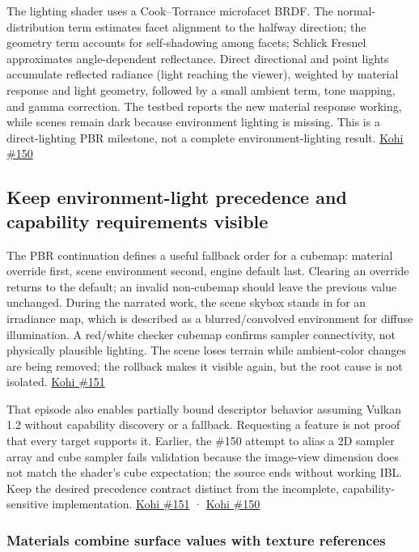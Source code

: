 The lighting shader uses a Cook--Torrance microfacet BRDF. The normal-distribution term estimates facet alignment to the halfway direction; the geometry term accounts for self-shadowing among facets; Schlick Fresnel approximates angle-dependent reflectance. Direct directional and point lights accumulate reflected radiance (light reaching the viewer), weighted by material response and light geometry, followed by a small ambient term, tone mapping, and gamma correction. The testbed reports the new material response working, while scenes remain dark because environment lighting is missing. This is a direct-lighting PBR milestone, not a complete environment-lighting result. \href{https://www.youtube.com/watch?v=SNdjjeRAFc4}{Kohi \#150}

\subsection{Keep environment-light precedence and capability requirements visible}\label{06-engine-ii-ch025-keep-environment-light-precedence-and-capability-requirements-visible}

The PBR continuation defines a useful fallback order for a cubemap: material override first, scene environment second, engine default last. Clearing an override returns to the default; an invalid non-cubemap should leave the previous value unchanged. During the narrated work, the scene skybox stands in for an irradiance map, which is described as a blurred/convolved environment for diffuse illumination. A red/white checker cubemap confirms sampler connectivity, not physically plausible lighting. The scene loses terrain while ambient-color changes are being removed; the rollback makes it visible again, but the root cause is not isolated. \href{https://www.youtube.com/watch?v=OME4d4Zwd7k}{Kohi \#151}

That episode also enables partially bound descriptor behavior assuming Vulkan 1.2 without capability discovery or a fallback. Requesting a feature is not proof that every target supports it. Earlier, the \#150 attempt to alias a 2D sampler array and cube sampler fails validation because the image-view dimension does not match the shader's cube expectation; the source ends without working IBL. Keep the desired precedence contract distinct from the incomplete, capability-sensitive implementation. \href{https://www.youtube.com/watch?v=OME4d4Zwd7k}{Kohi \#151} · \href{https://www.youtube.com/watch?v=SNdjjeRAFc4}{Kohi \#150}

\subsubsection{Materials combine surface values with texture references}\label{06-engine-ii-ch025-materials-combine-surface-values-with-texture-references}

